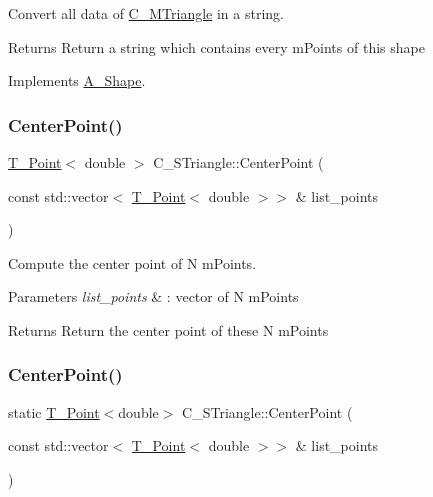 Convert all data of \hyperlink{classC__MTriangle}{C\+\_\+\+M\+Triangle} in a string. 

\begin{DoxyReturn}{Returns}
Return a string which contains every m\+Points of this shape 
\end{DoxyReturn}


Implements \hyperlink{classA__Shape_ad8804b4e74543db374af6892367b7c2e}{A\+\_\+\+Shape}.

\mbox{\label{classC__STriangle_a98c01a7d57aeee85ee4e2df88a786b7f}} 
\subsubsection{\texorpdfstring{Center\+Point()}{CenterPoint()}\hspace{0.1cm}{\footnotesize\ttfamily [1/2]}}
{\footnotesize\ttfamily \hyperlink{classT__Point}{T\+\_\+\+Point}$<$ double $>$ C\+\_\+\+S\+Triangle\+::\+Center\+Point (\begin{DoxyParamCaption}\item[{const std\+::vector$<$ \hyperlink{classT__Point}{T\+\_\+\+Point}$<$ double $>$$>$ \&}]{list\+\_\+points }\end{DoxyParamCaption})\hspace{0.3cm}{\ttfamily [static]}}



Compute the center point of N m\+Points. 


\begin{DoxyParams}{Parameters}
{\em list\+\_\+points} & \+: vector of N m\+Points \\
\hline
\end{DoxyParams}
\begin{DoxyReturn}{Returns}
Return the center point of these N m\+Points 
\end{DoxyReturn}
\mbox{\label{classC__STriangle_ae29fff7b2b4cb23c79886c28f4300ec6}} 
\subsubsection{\texorpdfstring{Center\+Point()}{CenterPoint()}\hspace{0.1cm}{\footnotesize\ttfamily [2/2]}}
{\footnotesize\ttfamily static \hyperlink{classT__Point}{T\+\_\+\+Point}$<$double$>$ C\+\_\+\+S\+Triangle\+::\+Center\+Point (\begin{DoxyParamCaption}\item[{const std\+::vector$<$ \hyperlink{classT__Point}{T\+\_\+\+Point}$<$ double $>$$>$ \&}]{list\+\_\+points }\end{DoxyParamCaption})\hspace{0.3cm}{\ttfamily [static]}}




